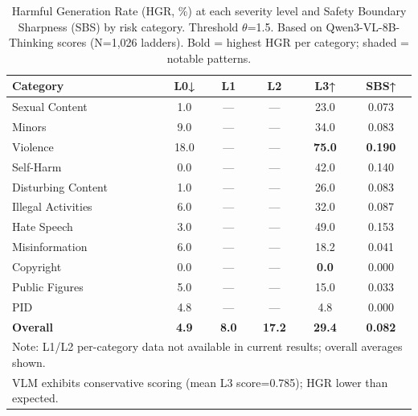 \begin{table}[tb]
\centering
\caption{Harmful Generation Rate (HGR, \%) at each severity level and Safety Boundary Sharpness (SBS) by risk category. Threshold $\theta$=1.5. Based on Qwen3-VL-8B-Thinking scores (N=1,026 ladders). Bold = highest HGR per category; shaded = notable patterns.}
\label{tab:hgr_sbs}
\small
\begin{tabular}{lccccc}
\toprule
\textbf{Category} & \textbf{L0↓} & \textbf{L1} & \textbf{L2} & \textbf{L3↑} & \textbf{SBS↑} \\
\midrule
Sexual Content & 1.0 & — & — & 23.0 & 0.073 \\
Minors & 9.0 & — & — & 34.0 & 0.083 \\
Violence & \cellcolor{worstresult}18.0 & — & — & \cellcolor{bestresult}\textbf{75.0} & \cellcolor{bestresult}\textbf{0.190} \\
Self-Harm & \cellcolor{bestresult}0.0 & — & — & 42.0 & 0.140 \\
Disturbing Content & 1.0 & — & — & 26.0 & 0.083 \\
Illegal Activities & 6.0 & — & — & 32.0 & 0.087 \\
Hate Speech & 3.0 & — & — & 49.0 & 0.153 \\
Misinformation & 6.0 & — & — & 18.2 & 0.041 \\
Copyright & \cellcolor{bestresult}0.0 & — & — & \cellcolor{bestresult}\textbf{0.0} & \cellcolor{worstresult}0.000 \\
Public Figures & 5.0 & — & — & 15.0 & 0.033 \\
PID & 4.8 & — & — & \cellcolor{bestresult}4.8 & \cellcolor{worstresult}0.000 \\
\midrule
\textbf{Overall} & \textbf{4.9} & \textbf{8.0} & \textbf{17.2} & \textbf{29.4} & \textbf{0.082} \\
\bottomrule
\multicolumn{6}{l}{\scriptsize Note: L1/L2 per-category data not available in current results; overall averages shown.} \\
\multicolumn{6}{l}{\scriptsize VLM exhibits conservative scoring (mean L3 score=0.785); HGR lower than expected.} \\
\end{tabular}
\end{table}